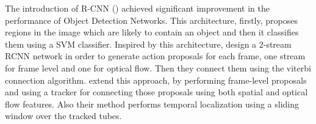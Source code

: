 The introduction of R-CNN (\cite{DBLP:journals/corr/GirshickDDM13}) achieved significant improvement
in the performance of Object Detection Networks. This architecture, firstly, proposes regions in the image which are likely to
contain an object and then it classifies them using a SVM classifier. Inspired by this architecture, \cite{DBLP:journals/corr/GkioxariM14}
design a 2-stream RCNN network in order to generate action proposals for each frame, one stream for frame level and one for optical flow.
Then they  connect them using the viterbi connection algorithm. \cite{DBLP:journals/corr/WeinzaepfelHS15} extend this approach, by performing
frame-level proposals and using a tracker for connecting those proposals using both spatial and optical flow features. Also their method performs
temporal localization using a sliding window over the tracked tubes.

